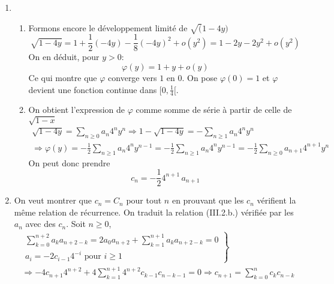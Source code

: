 \begin{enumerate}
  \item 
\begin{enumerate}
  \item Formons encore le développement limité de $\sqrt(1-4y)$
\begin{displaymath}
  \sqrt{1-4y} = 1 + \frac{1}{2}(-4y) - \frac{1}{8}(-4y)^2 + o(y^2)
  =1-2y -2y^2 + o(y^2)
\end{displaymath}
On en déduit, pour $y>0$:
\begin{displaymath}
\varphi(y) = 1 + y + o(y)
\end{displaymath}
Ce qui montre que $\varphi$ converge vers $1$ en $0$. On pose $\varphi(0)=1$ et $\varphi$ devient une fonction continue dans $[0,\frac{1}{4}[$.
  \item On obtient l'expression de $\varphi$ comme somme de série à partir de celle de $\sqrt{1-x}$
\begin{multline*}
\sqrt{1-4y} = \sum_{n\geq 0} a_n 4^n y^n
\Rightarrow
1- \sqrt{1-4y} = - \sum_{n\geq 1} a_n 4^n y^n \\
\Rightarrow
\varphi(y) = - \frac{1}{2}\sum_{n\geq 1} a_n 4^n y^{n-1}
= -\frac{1}{2}\sum_{n\geq 1} a_n 4^{n} y^{n-1}
= -\frac{1}{2} \sum_{n\geq 0} a_{n+1} 4^{n+1} y^{n}
\end{multline*}
On peut donc prendre
\begin{displaymath}
  c_n = -\frac{1}{2} 4^{n+1}\,a_{n+1}
\end{displaymath}
\end{enumerate}

  \item On veut montrer que $c_n=C_n$ pour tout $n$ en prouvant que les $c_n$ vérifient la même relation de récurrence. On traduit la relation (III.2.b.) vérifiée par les $a_n$ avec des $c_n$. Soit $n\geq0$,
\begin{multline*}
\left. 
\begin{aligned}
\sum_{k=0}^{n+2} a_k a_{n+2-k}= 2a_0a_{n+2} + \sum_{k=1}^{n+1} a_k a_{n+2-k}=0\\ a_{i} = -2c_{i-1}4^{-i} \text{ pour } i\geq 1  
\end{aligned}
\right\rbrace \\ 
\Rightarrow 
-4c_{n+1}4^{n+2} + 4\sum_{k=1}^{n+1} 4^{n+2}c_{k-1} c_{n-k-1}=0 
\Rightarrow
c_{n+1} = \sum_{k=0}^{n}c_{k} c_{n-k}
\end{multline*}

\end{enumerate}


